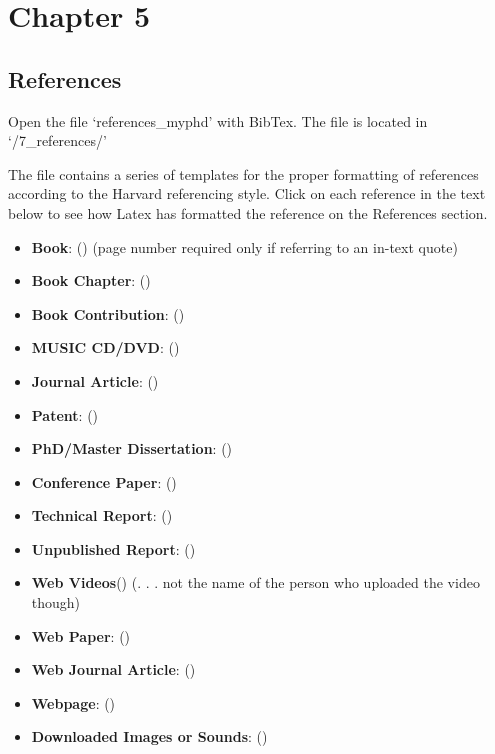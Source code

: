 


\chapter{Chapter 5} %

\ifpdf
    \graphicspath{{5_chapter5/figures/PNG/}{5_chapter5/figures/PDF/}{5_chapter5/figures/}}
\else
    \graphicspath{{5_chapter5/figures/EPS/}{5_chapter5/figures/}}
\fi




\section{References}

Open the file `references\_myphd' with BibTex. The file is located in `/7\_references/'

The file contains a series of templates for the proper formatting of references according to the Harvard referencing style.
Click on each reference in the text below to see how Latex has formatted the reference on the References section.

\begin{itemize}
\item \textbf{Book}: () (page number required only if referring to an in-text quote)
\item \textbf{Book Chapter}: ()
\item \textbf{Book Contribution}: ()
\item \textbf{MUSIC CD/DVD}: ()
\item \textbf{Journal Article}: ()
\item \textbf{Patent}: ()
\item \textbf{PhD/Master Dissertation}: ()
\item \textbf{Conference Paper}: ()
\item \textbf{Technical Report}: ()
\item \textbf{Unpublished Report}: ()
\item \textbf{Web Videos}() (. . . not the name of the person who uploaded the video though)
\item \textbf{Web Paper}: () 
\item \textbf{Web Journal Article}: ()
\item \textbf{Webpage}: ()
\item \textbf{Downloaded Images or Sounds}: ()
\end{itemize}



